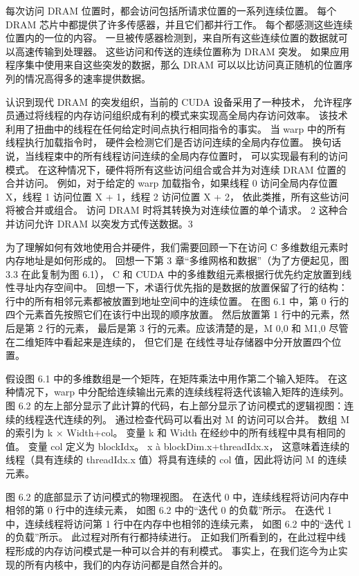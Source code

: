 每次访问 DRAM 位置时，都会访问包括所请求位置的一系列连续位置。 
每个 DRAM 芯片中都提供了许多传感器，并且它们都并行工作。 每个都感测这些连续位置内的一位的内容。 
一旦被传感器检测到，来自所有这些连续位置的数据就可以高速传输到处理器。 这些访问和传送的连续位置称为 DRAM 突发。 
如果应用程序集中使用来自这些突发的数据，那么 DRAM 可以以比访问真正随机的位置序列的情况高得多的速率提供数据。

认识到现代 DRAM 的突发组织，当前的 CUDA 设备采用了一种技术，
允许程序员通过将线程的内存访问组织成有利的模式来实现高全局内存访问效率。 
该技术利用了扭曲中的线程在任何给定时间点执行相同指令的事实。 当 warp 中的所有线程执行加载指令时，
硬件会检测它们是否访问连续的全局内存位置。 换句话说，当线程束中的所有线程访问连续的全局内存位置时，
可以实现最有利的访问模式。 在这种情况下，硬件将所有这些访问组合或合并为对连续 DRAM 位置的合并访问。 
例如，对于给定的 warp 加载指令，如果线程 0 访问全局内存位置 X，线程 1 访问位置 X + 1，线程 2 访问位置 X + 2，
依此类推，所有这些访问将被合并或组合。 访问 DRAM 时将其转换为对连续位置的单个请求。 2 
这种合并访问允许 DRAM 以突发方式传送数据。3

为了理解如何有效地使用合并硬件，我们需要回顾一下在访问 C 多维数组元素时内存地址是如何形成的。 
回想一下第 3 章“多维网格和数据”（为了方便起见，图 3.3 在此复制为图 6.1），
C 和 CUDA 中的多维数组元素根据行优先约定放置到线性寻址内存空间中。 
回想一下，术语行优先指的是数据的放置保留了行的结构：行中的所有相邻元素都被放置到地址空间中的连续位置。 
在图 6.1 中，第 0 行的四个元素首先按照它们在该行中出现的顺序放置。 然后放置第 1 行中的元素，然后是第 2 行的元素，
最后是第 3 行的元素。应该清楚的是，M 0,0 和 M1,0 尽管在二维矩阵中看起来是连续的，
但它们是 在线性寻址存储器中分开放置四个位置。

假设图 6.1 中的多维数组是一个矩阵，在矩阵乘法中用作第二个输入矩阵。 
在这种情况下，warp 中分配给连续输出元素的连续线程将迭代该输入矩阵的连续列。 
图 6.2 的左上部分显示了此计算的代码，右上部分显示了访问模式的逻辑视图：连续的线程迭代连续的列。 
通过检查代码可以看出对 M 的访问可以合并。 数组 M 的索引为 k × Width+col。 
变量 k 和 Width 在经纱中的所有线程中具有相同的值。 变量 col 定义为 blockIdx。 x à blockDim.x+threadIdx.x，
这意味着连续的线程（具有连续的 threadIdx.x 值）将具有连续的 col 值，因此将访问 M 的连续元素。

图 6.2 的底部显示了访问模式的物理视图。 在迭代 0 中，连续线程将访问内存中相邻的第 0 行中的连续元素，
如图 6.2 中的“迭代 0 的负载”所示。 在迭代 1 中，连续线程将访问第 1 行中在内存中也相邻的连续元素，
如图 6.2 中的“迭代 1 的负载”所示。 此过程对所有行都持续进行。 
正如我们所看到的，在此过程中线程形成的内存访问模式是一种可以合并的有利模式。 
事实上，在我们迄今为止实现的所有内核中，我们的内存访问都是自然合并的。

